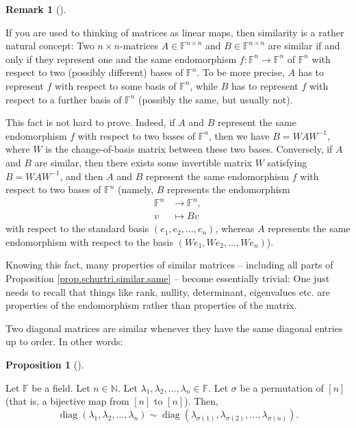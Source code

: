 \documentclass[numbers=enddot,12pt,final,onecolumn,notitlepage]{scrartcl}%
\numberwithin{exer}{subsection}
\theoremstyle{definition}
\newtheorem{prop}[theo]{Proposition}
\newenvironment{proposition}[1][]
{\begin{prop}[#1]\begin{leftbar}}
{\end{leftbar}\end{prop}}
\newtheorem{remk}[theo]{Remark}
\newenvironment{remark}[1][]
{\begin{remk}[#1]\begin{leftbar}}
{\end{leftbar}\end{remk}}
\begin{document}
\begin{remark}
\label{rmk.schurtri.similar.endo-vp}If you are used to thinking of matrices as
linear maps, then similarity is a rather natural concept: Two $n\times
n$-matrices $A\in\mathbb{F}^{n\times n}$ and $B\in\mathbb{F}^{n\times n}$ are
similar if and only if they represent one and the same endomorphism
$f:\mathbb{F}^{n}\rightarrow\mathbb{F}^{n}$ of $\mathbb{F}^{n}$ with respect
to two (possibly different) bases of $\mathbb{F}^{n}$. To be more precise, $A$
has to represent $f$ with respect to some basis of $\mathbb{F}^{n}$, while $B$
has to represent $f$ with respect to a further basis of $\mathbb{F}^{n}$
(possibly the same, but usually not).

This fact is not hard to prove. Indeed, if $A$ and $B$ represent the same
endomorphism $f$ with respect to two bases of $\mathbb{F}^{n}$, then we have
$B=WAW^{-1}$, where $W$ is the change-of-basis matrix between these two bases.
Conversely, if $A$ and $B$ are similar, then there exists some invertible
matrix $W$ satisfying $B=WAW^{-1}$, and then $A$ and $B$ represent the same
endomorphism $f$ with respect to two bases of $\mathbb{F}^{n}$ (namely, $B$
represents the endomorphism%
\begin{align*}
\mathbb{F}^{n}  &  \rightarrow\mathbb{F}^{n},\\
v  &  \mapsto Bv
\end{align*}
with respect to the standard basis $\left(  e_{1},e_{2},\ldots,e_{n}\right)
$, whereas $A$ represents the same endomorphism with respect to the basis
$\left(  We_{1},We_{2},\ldots,We_{n}\right)  $).

Knowing this fact, many properties of similar matrices -- including all parts
of Proposition \ref{prop.schurtri.similar.same} -- become essentially trivial:
One just needs to recall that things like rank, nullity, determinant,
eigenvalues etc. are properties of the endomorphism rather than properties of
the matrix.
\end{remark}

Two diagonal matrices are similar whenever they have the same diagonal entries
up to order. In other words:

\begin{proposition}
\label{prop.schurtri.similar.diag}Let $\mathbb{F}$ be a field. Let
$n\in\mathbb{N}$. Let $\lambda_{1},\lambda_{2},\ldots,\lambda_{n}\in
\mathbb{F}$. Let $\sigma$ be a permutation of $\left[  n\right]  $ (that is, a
bijective map from $\left[  n\right]  $ to $\left[  n\right]  $). Then,%
\[
\operatorname*{diag}\left(  \lambda_{1},\lambda_{2},\ldots,\lambda_{n}\right)
\sim\operatorname*{diag}\left(  \lambda_{\sigma\left(  1\right)  }%
,\lambda_{\sigma\left(  2\right)  },\ldots,\lambda_{\sigma\left(  n\right)
}\right)  .
\]

\end{proposition}
\end{document}
